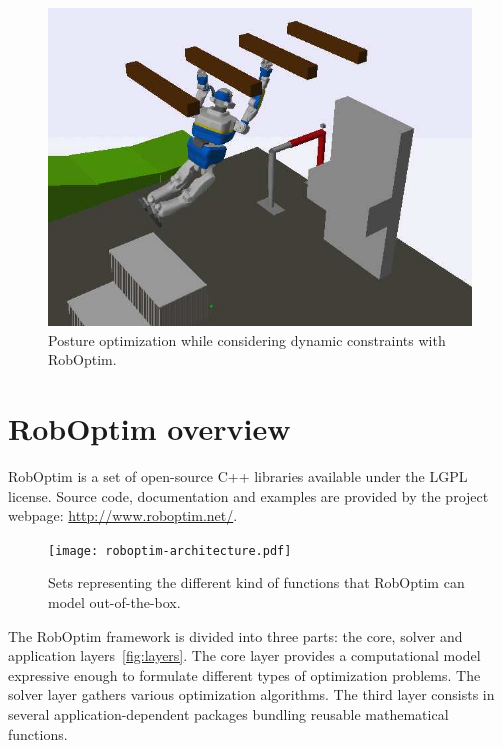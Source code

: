 \documentclass[conference,final,a4paper,twocolumn,9pt]{IEEEtran}
\begin{document}
\begin{figure}[ht!]
  \begin{center}
    \includegraphics[width=\linewidth]{agent-067.jpg}
    \caption{Posture optimization while considering dynamic
      constraints with RobOptim.\label{fig:stence-optimization}}
  \end{center}
\end{figure}



\section{RobOptim overview}\label{sec:roboptim}


RobOptim is a set of open-source C++ libraries avail\-able under the
LGPL license. Source code, documenta\-tion and examples are provided by
the project webpage: \mbox{\url{http://www.roboptim.net/}}.


\begin{figure}
  \begin{center}
    \texttt{[image: roboptim-architecture.pdf]}
  \end{center}
  \caption{Sets representing the different kind of functions that
    RobOptim can model out-of-the-box.}\label{fig:layers}
\end{figure}


The RobOptim framework is divided into three parts: the core, solver
and application layers~\autoref{fig:layers}. The core layer provides a
computational model expressive enough to formulate different types of
optimization problems. The solver layer gathers various optimization
algorithms. The third layer consists in several application-dependent
packages bundling reusable mathematical functions.
\end{document}
